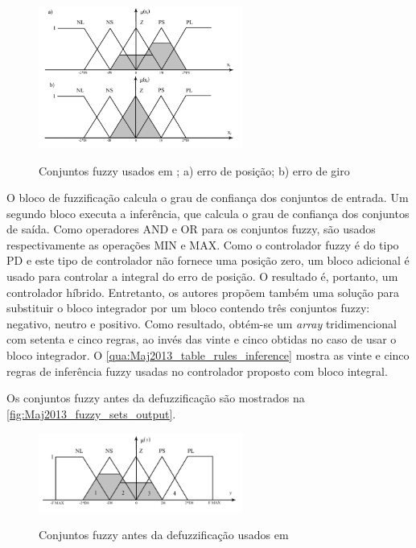 \begin{figure}[!htb]
    \centering
    \caption{Conjuntos fuzzy usados em \cite{Maj2013}; a) erro de posição; b) erro de giro }
    \includegraphics[width=0.6\textwidth]{./04-figuras/Maj2013_fuzzy_sets}
    \label{fig:Maj2013_fuzzy_sets}
\end{figure}

O bloco de fuzzificação calcula o grau de confiança dos conjuntos de entrada. Um segundo bloco executa a inferência, que calcula o grau de confiança dos conjuntos de saída. Como operadores AND e OR para os conjuntos fuzzy, são usados respectivamente as operações MIN e MAX. Como o controlador fuzzy é do tipo PD e este tipo de controlador não fornece uma posição zero, um bloco adicional é usado para controlar a integral do erro de posição. O resultado é, portanto, um controlador híbrido. Entretanto, os autores propõem também uma solução para substituir o bloco integrador por um bloco contendo três conjuntos fuzzy: negativo, neutro e positivo. Como resultado, obtém-se um \textit{array} tridimencional com setenta e cinco regras, ao invés das vinte e cinco obtidas no caso de usar o bloco integrador. O \autoref{qua:Maj2013_table_rules_inference} mostra as vinte e cinco regras de inferência fuzzy usadas no controlador proposto com bloco integral.



Os conjuntos fuzzy antes da defuzzificação são mostrados na \autoref{fig:Maj2013_fuzzy_sets_output}.

\begin{figure}[!htb]
    \centering
    \caption{Conjuntos fuzzy antes da defuzzificação usados em \cite{Maj2013} }
    \includegraphics[width=0.6\textwidth]{./04-figuras/Maj2013_fuzzy_sets_output}
    \label{fig:Maj2013_fuzzy_sets_output}
\end{figure}

